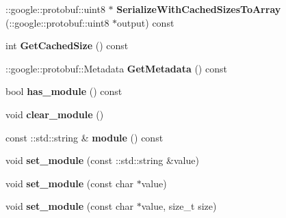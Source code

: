 \begin{DoxyCompactItemize}
\item 
\mbox{\label{classcaffe_1_1_python_parameter_a5363b58d2e500c2483573ef9f4a96214}} 
\+::google\+::protobuf\+::uint8 $\ast$ {\bfseries Serialize\+With\+Cached\+Sizes\+To\+Array} (\+::google\+::protobuf\+::uint8 $\ast$output) const
\item 
\mbox{\label{classcaffe_1_1_python_parameter_aea221e617b8db1b293efb35decdb4f79}} 
int {\bfseries Get\+Cached\+Size} () const
\item 
\mbox{\label{classcaffe_1_1_python_parameter_ad43fbd1cbbf279f619f1ea3c6babf03e}} 
\+::google\+::protobuf\+::\+Metadata {\bfseries Get\+Metadata} () const
\item 
\mbox{\label{classcaffe_1_1_python_parameter_a37bad682d024bf86b9a7a32568a8aea9}} 
bool {\bfseries has\+\_\+module} () const
\item 
\mbox{\label{classcaffe_1_1_python_parameter_ab7b8fae95d2350c8f30b1a4df5b139a4}} 
void {\bfseries clear\+\_\+module} ()
\item 
\mbox{\label{classcaffe_1_1_python_parameter_a613a9972e21d2c24a064978b986eb5c9}} 
const \+::std\+::string \& {\bfseries module} () const
\item 
\mbox{\label{classcaffe_1_1_python_parameter_af4252ab7552a9fbccb421c08e0d7480c}} 
void {\bfseries set\+\_\+module} (const \+::std\+::string \&value)
\item 
\mbox{\label{classcaffe_1_1_python_parameter_ac354afe9509dc443de8cd2e679d419a5}} 
void {\bfseries set\+\_\+module} (const char $\ast$value)
\item 
\mbox{\label{classcaffe_1_1_python_parameter_ad4049c5f7e99ba0becb273dffaf635ff}} 
void {\bfseries set\+\_\+module} (const char $\ast$value, size\+\_\+t size)
\item 
\mbox{\label{classcaffe_1_1_python_parameter_aa43d6b3ab8a42431dd3b26521ccafd34}} 

\end{DoxyCompactItemize}
